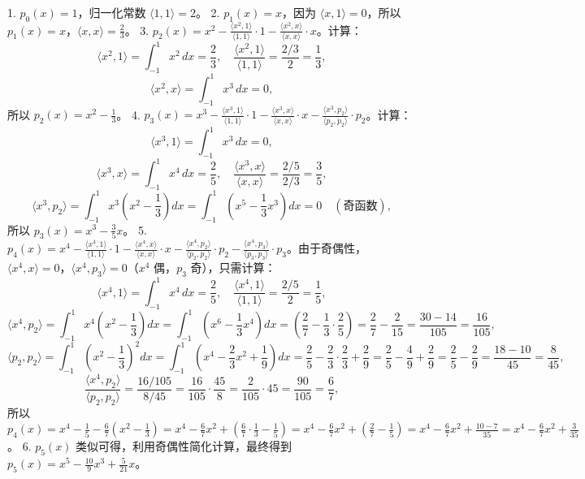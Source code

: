 \documentclass{article}
\begin{document}
1. \(p_0(x) = 1\)，归一化常数 \(\langle 1, 1 \rangle = 2\)。
2. \(p_1(x) = x\)，因为 \(\langle x, 1 \rangle = 0\)，所以 \(p_1(x) = x\)，\(\langle x, x \rangle = \frac{2}{3}\)。
3. \(p_2(x) = x^2 - \frac{\langle x^2, 1 \rangle}{\langle 1, 1 \rangle} \cdot 1 - \frac{\langle x^2, x \rangle}{\langle x, x \rangle} \cdot x\)。计算：
   \[
   \langle x^2, 1 \rangle = \int_{-1}^1 x^2 \, dx = \frac{2}{3}, \quad \frac{\langle x^2, 1 \rangle}{\langle 1, 1 \rangle} = \frac{2/3}{2} = \frac{1}{3},
   \]
   \[
   \langle x^2, x \rangle = \int_{-1}^1 x^3 \, dx = 0,
   \]
   所以 \(p_2(x) = x^2 - \frac{1}{3}\)。
4. \(p_3(x) = x^3 - \frac{\langle x^3, 1 \rangle}{\langle 1, 1 \rangle} \cdot 1 - \frac{\langle x^3, x \rangle}{\langle x, x \rangle} \cdot x - \frac{\langle x^3, p_2 \rangle}{\langle p_2, p_2 \rangle} \cdot p_2\)。计算：
   \[
   \langle x^3, 1 \rangle = \int_{-1}^1 x^3 \, dx = 0,
   \]
   \[
   \langle x^3, x \rangle = \int_{-1}^1 x^4 \, dx = \frac{2}{5}, \quad \frac{\langle x^3, x \rangle}{\langle x, x \rangle} = \frac{2/5}{2/3} = \frac{3}{5},
   \]
   \[
   \langle x^3, p_2 \rangle = \int_{-1}^1 x^3 \left( x^2 - \frac{1}{3} \right) dx = \int_{-1}^1 \left( x^5 - \frac{1}{3} x^3 \right) dx = 0 \quad (\text{奇函数}),
   \]
   所以 \(p_3(x) = x^3 - \frac{3}{5}x\)。
5. \(p_4(x) = x^4 - \frac{\langle x^4, 1 \rangle}{\langle 1, 1 \rangle} \cdot 1 - \frac{\langle x^4, x \rangle}{\langle x, x \rangle} \cdot x - \frac{\langle x^4, p_2 \rangle}{\langle p_2, p_2 \rangle} \cdot p_2 - \frac{\langle x^4, p_3 \rangle}{\langle p_3, p_3 \rangle} \cdot p_3\)。由于奇偶性，\(\langle x^4, x \rangle = 0\)，\(\langle x^4, p_3 \rangle = 0\)（\(x^4\) 偶，\(p_3\) 奇），只需计算：
   \[
   \langle x^4, 1 \rangle = \int_{-1}^1 x^4 \, dx = \frac{2}{5}, \quad \frac{\langle x^4, 1 \rangle}{\langle 1, 1 \rangle} = \frac{2/5}{2} = \frac{1}{5},
   \]
   \[
   \langle x^4, p_2 \rangle = \int_{-1}^1 x^4 \left( x^2 - \frac{1}{3} \right) dx = \int_{-1}^1 \left( x^6 - \frac{1}{3} x^4 \right) dx = \left( \frac{2}{7} - \frac{1}{3} \cdot \frac{2}{5} \right) = \frac{2}{7} - \frac{2}{15} = \frac{30-14}{105} = \frac{16}{105},
   \]
   \[
   \langle p_2, p_2 \rangle = \int_{-1}^1 \left( x^2 - \frac{1}{3} \right)^2 dx = \int_{-1}^1 \left( x^4 - \frac{2}{3} x^2 + \frac{1}{9} \right) dx = \frac{2}{5} - \frac{2}{3} \cdot \frac{2}{3} + \frac{2}{9} = \frac{2}{5} - \frac{4}{9} + \frac{2}{9} = \frac{2}{5} - \frac{2}{9} = \frac{18-10}{45} = \frac{8}{45},
   \]
   \[
   \frac{\langle x^4, p_2 \rangle}{\langle p_2, p_2 \rangle} = \frac{16/105}{8/45} = \frac{16}{105} \cdot \frac{45}{8} = \frac{2}{105} \cdot 45 = \frac{90}{105} = \frac{6}{7},
   \]
   所以 \(p_4(x) = x^4 - \frac{1}{5} - \frac{6}{7} \left( x^2 - \frac{1}{3} \right) = x^4 - \frac{6}{7}x^2 + \left( \frac{6}{7} \cdot \frac{1}{3} - \frac{1}{5} \right) = x^4 - \frac{6}{7}x^2 + \left( \frac{2}{7} - \frac{1}{5} \right) = x^4 - \frac{6}{7}x^2 + \frac{10-7}{35} = x^4 - \frac{6}{7}x^2 + \frac{3}{35}\)。
6. \(p_5(x)\) 类似可得，利用奇偶性简化计算，最终得到 \(p_5(x) = x^5 - \frac{10}{9}x^3 + \frac{5}{21}x\)。
\end{document}
